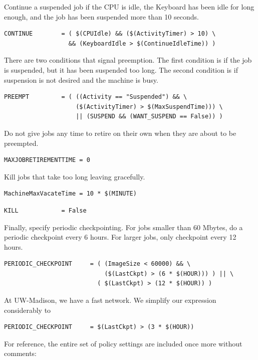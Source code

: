 Continue a suspended job if the CPU is idle, the Keyboard has been
idle for long enough, and the job has been suspended more
than 10 seconds.
\begin{verbatim}
CONTINUE        = ( $(CPUIdle) && ($(ActivityTimer) > 10) \
                  && (KeyboardIdle > $(ContinueIdleTime)) )
\end{verbatim}

There are two conditions that signal preemption.
The first condition is if the job is suspended,
but it has been suspended too long.
The second condition is if suspension is not desired and the machine is busy. 
\begin{verbatim}
PREEMPT	        = ( ((Activity == "Suspended") && \
                    ($(ActivityTimer) > $(MaxSuspendTime))) \
                    || (SUSPEND && (WANT_SUSPEND == False)) )
\end{verbatim}


Do not give jobs any time to retire on their own when they are about to
be preempted.

\begin{verbatim}
MAXJOBRETIREMENTTIME = 0
\end{verbatim}


Kill jobs that take too long leaving gracefully.
\begin{verbatim}
MachineMaxVacateTime = 10 * $(MINUTE)
\end{verbatim}

\begin{verbatim}
KILL            = False
\end{verbatim}

Finally, specify periodic checkpointing.  
For jobs smaller than 60 Mbytes, do a periodic checkpoint every 6 hours.  
For larger jobs, only checkpoint every 12 hours.
\begin{verbatim}
PERIODIC_CHECKPOINT     = ( (ImageSize < 60000) && \
                            ($(LastCkpt) > (6 * $(HOUR))) ) || \ 
                          ( $(LastCkpt) > (12 * $(HOUR)) )
\end{verbatim}

\index{policy!at UW-Madison}

At UW-Madison, we have a fast network.
We simplify our expression considerably to
\begin{verbatim}
PERIODIC_CHECKPOINT     = $(LastCkpt) > (3 * $(HOUR))
\end{verbatim}

For reference, the entire set of policy settings are included
once more without comments:

